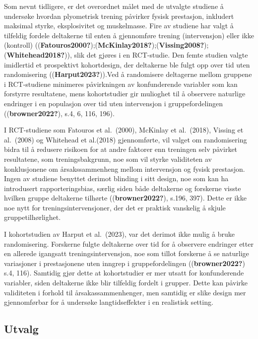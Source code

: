 \documentclass[
  letterpaper,
  DIV=11,
  numbers=noendperiod]{scrreprt}
\begin{document}
Som nevnt tidligere, er det overordnet målet med de utvalgte studiene å
undersøke hvordan plyometrisk trening påvirker fysisk prestasjon,
inkludert maksimal styrke, eksplosivitet og muskelmasse. Fire av
studiene har valgt å tilfeldig fordele deltakerne til enten å
gjennomføre trening (intervensjon) eller ikke (kontroll)
((\textbf{Fatouros2000?});(\textbf{McKinlay2018?});(\textbf{Vissing2008?});(\textbf{Whitehead2018?})),
slik det gjøres i en RCT-studie. Den femte studien valgte imidlertid et
prospektivt kohortdesign, der deltakerne ble fulgt opp over tid uten
randomisering ((\textbf{Harput2023?})).Ved å randomisere deltagerne
mellom gruppene i RCT-studiene minimeres påvirkningen av konfunderende
variabler som kan forstyrre resultatene, mens kohortstudier gir
mulioghet til å observere naturlige endringer i en populasjon over tid
uten intervensjon i gruppefordelingen ((\textbf{browner2022?}), s.4, 6,
116, 196).

I RCT-studiene som Fatouros et al.~(2000), McKinlay et al.~(2018),
Vissing et al.~(2008) og Whitehead et al.(2018) gjennomførte, vil valget
om randomisering bidra til å redusere risikoen for at andre faktorer enn
treningen selv påvirket resultatene, som treningsbakgrunn, noe som vil
styrke validiteten av konklusjonene om årsakssammenheng mellom
intervensjon og fysisk prestasjon. Ingen av studiene benyttet derimot
blinding i sitt design, noe som kan ha introdusert rapporteringsbias,
særlig siden både deltakerne og forskerne visste hvilken gruppe
deltakerne tilhørte ((\textbf{browner2022?}), s.196, 397). Dette er ikke
noe nytt for treningsintervensjoner, der det er praktisk vanskelig å
skjule gruppetilhørlighet.

I kohortstudien av Harput et al.~(2023), var det derimot ikke mulig å
bruke randomisering. Forskerne fulgte deltakerne over tid for å
observere endringer etter en allerede igangsatt treningsintervensjon,
noe som tillot forskerne å se naturlige variasjoner i prestasjonene uten
inngrep i gruppefordelingen ((\textbf{browner2022?}) s.4, 116). Samtidig
gjør dette at kohortstudier er mer utsatt for konfunderende variabler,
siden deltakerne ikke blir tilfeldig fordelt i grupper. Dette kan
påvirke validiteten i forhold til årsakassammenhenger, men samtidig er
slike design mer gjennomførbar for å undersøke langtidseffekter i en
realistisk setting.

\subsection{Utvalg}\label{utvalg}
\end{document}
